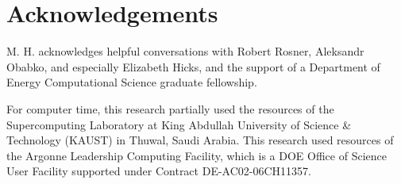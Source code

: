 \section{Acknowledgements}
M. H. acknowledges helpful conversations with Robert Rosner, Aleksandr Obabko, and especially Elizabeth Hicks, and the support of a Department of Energy Computational Science graduate fellowship.

For computer time, this research partially used the resources of the
Supercomputing Laboratory at King Abdullah University of Science \& Technology
 (KAUST) in Thuwal, Saudi Arabia.
This research used resources of the Argonne Leadership Computing Facility, which
is a DOE Office of Science User Facility supported under Contract DE-AC02-06CH11357.

